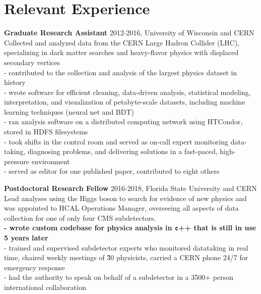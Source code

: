 \documentclass[letterpaper,12pt]{article} %
\begin{document}
\section{Relevant Experience}
 {\large {\bf Graduate Research Assistant} 2012-2016, University of Wisconsin and CERN} \\
  Collected and analyzed data from the CERN Large Hadron Collider (LHC), specializing in dark matter searches and heavy-flavor physics with displaced secondary vertices  \\ %
 - contributed to the collection and analysis of the largest physics dataset in history \\
 - wrote software for efficient cleaning, data-driven analysis, statistical modeling, interpretation, and visualization of petabyte-scale datasets, including machine learning techniques (neural net and BDT) \\
 - ran analysis software on a distributed computing network using HTCondor, stored in HDFS filesystems \\
 - took shifts in the control room and served as on-call expert monitoring data-taking, diagnosing problems, and delivering solutions in a fast-paced, high-pressure environment  \\
 - served as editor for one published paper, contributed to eight others 

 {\large {\bf Postdoctoral Research Fellow} 2016-2018, Florida State University and CERN}  \\
 Lead analyses using the Higgs boson to search for evidence of new physics and was appointed to HCAL Operations Manager, overseeing all aspects of data collection for one of only four CMS subdetectors. \\ %
{\bf - wrote custom codebase for physics analysis in {\texttt c++} that is still in use 5 years later} \\
- trained and supervised subdetector experts who monitored datataking in real time, chaired weekly meetings of \~30 physicists, carried a CERN phone 24/7 for emergency response \\
- had the authority to speak on behalf of a subdetector in a 3500+ person international collaboration
\end{document}
